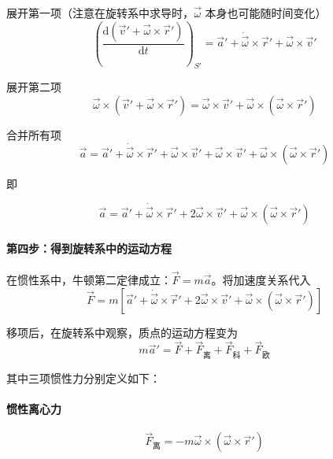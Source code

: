展开第一项（注意在旋转系中求导时，$\vec{\omega}$ 本身也可能随时间变化）
\begin{equation}
    \left(\frac{\mathrm{d}(\vec{v}' + \vec{\omega} \times \vec{r}')}{\mathrm{d}t}\right)_{S'} = \vec{a}' + \dot{\vec{\omega}} \times \vec{r}' + \vec{\omega} \times \vec{v}'
\end{equation}

展开第二项
\begin{equation}
    \vec{\omega} \times (\vec{v}' + \vec{\omega} \times \vec{r}') = \vec{\omega} \times \vec{v}' + \vec{\omega} \times (\vec{\omega} \times \vec{r}')
\end{equation}

合并所有项
\begin{equation}
    \vec{a} = \vec{a}' + \dot{\vec{\omega}} \times \vec{r}' + \vec{\omega} \times \vec{v}' + \vec{\omega} \times \vec{v}' + \vec{\omega} \times (\vec{\omega} \times \vec{r}')
\end{equation}

即

\begin{equation}
    \boxed{
        \vec{a} = \vec{a}' + \dot{\vec{\omega}} \times \vec{r}' + 2\vec{\omega} \times \vec{v}' + \vec{\omega} \times (\vec{\omega} \times \vec{r}')
    }
\end{equation}

\paragraph*{第四步：得到旋转系中的运动方程}

在惯性系中，牛顿第二定律成立：$\vec{F} = m\vec{a}$。将加速度关系代入
\begin{equation}
    \vec{F} = m\left[\vec{a}' + \dot{\vec{\omega}} \times \vec{r}' + 2\vec{\omega} \times \vec{v}' + \vec{\omega} \times (\vec{\omega} \times \vec{r}')\right]
\end{equation}

移项后，在旋转系中观察，质点的运动方程变为
\begin{equation}
    m\vec{a}' = \vec{F} + \vec{F}_{\text{离}} + \vec{F}_{\text{科}} + \vec{F}_{\text{欧}}
\end{equation}

其中三项惯性力分别定义如下：

\paragraph*{惯性离心力}
\begin{equation}
    \vec{F}_{\text{离}} = -m\vec{\omega} \times (\vec{\omega} \times \vec{r}')
\end{equation}

